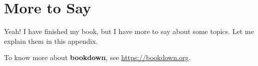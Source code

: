 \documentclass[10pt,a5paper,]{book}
\begin{document}
\cleardoublepage

\hypertarget{appendix-appendix}{%
\appendix {}}


\hypertarget{more-to-say}{%
\chapter{More to Say}\label{more-to-say}}

Yeah! I have finished my book, but I have more to say about some topics. Let me explain them in this appendix.

To know more about \textbf{bookdown}, see \url{https://bookdown.org}.

\backmatter
\printindex
\end{document}
